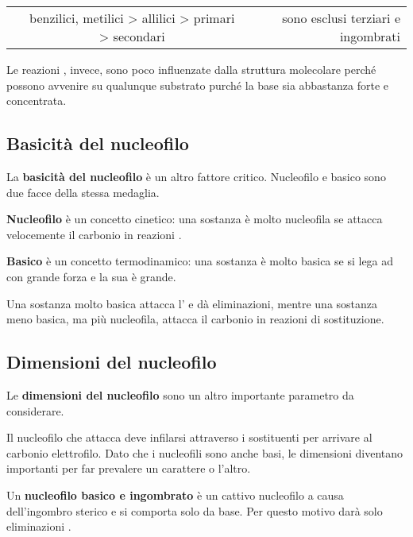 \begin{center}
	\begin{tabular}{lcr}
		\mech[2] & benzilici, metilici > allilici > primari > secondari & sono esclusi terziari e ingombrati \\
	\end{tabular}
\end{center}

Le reazioni \mech[e2], invece, sono poco influenzate dalla struttura molecolare perché possono avvenire su qualunque substrato purché la base sia abbastanza forte e concentrata.


\subsection*{Basicità del nucleofilo}
La \textbf{basicità del nucleofilo} è un altro fattore critico. Nucleofilo e basico sono due facce della stessa medaglia.

\textbf{Nucleofilo} è un concetto cinetico: una sostanza è molto nucleofila se attacca velocemente il carbonio in reazioni \mech[2].

\textbf{Basico} è un concetto termodinamico: una sostanza è molto basica se si lega ad  con grande forza e la sua \Kb è grande.

Una sostanza molto basica attacca l’ e dà eliminazioni, mentre una sostanza meno basica, ma più nucleofila, attacca il carbonio in reazioni di sostituzione.


\subsection*{Dimensioni del nucleofilo}
Le \textbf{dimensioni del nucleofilo} sono un altro importante parametro da considerare.

Il nucleofilo che attacca deve infilarsi attraverso i sostituenti per arrivare al carbonio elettrofilo. Dato che i nucleofili sono anche basi, le dimensioni diventano importanti per far prevalere un carattere o l'altro.

Un \textbf{nucleofilo basico e ingombrato} è un cattivo nucleofilo a causa dell'ingombro sterico e si comporta solo da base. Per questo motivo darà solo eliminazioni \mech[e2].

